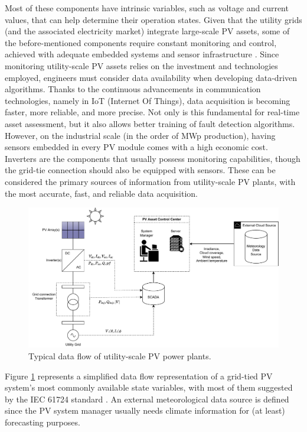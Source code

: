 Most of these components have intrinsic variables, such as voltage and current values, that can help determine their operation states. Given that the utility grids (and the associated electricity market) integrate large-scale PV assets, some of the before-mentioned components require constant monitoring and control, achieved with adequate embedded systems and sensor infrastructure \cite{AIPV}. Since monitoring utility-scale PV assets relies on the investment and technologies employed, engineers must consider data availability when developing data-driven algorithms. Thanks to the continuous advancements in communication technologies, namely in IoT (Internet Of Things), data acquisition is becoming faster, more reliable, and more precise. Not only is this fundamental for real-time asset assessment, but it also allows better training of fault detection algorithms. However, on the industrial scale (in the order of MWp production), having sensors embedded in every PV module comes with a high economic cost. Inverters are the components that usually possess monitoring capabilities, though the grid-tie connection should also be equipped with sensors. These can be considered the primary sources of information from utility-scale PV plants, with the most accurate, fast, and reliable data acquisition.

\begin{figure}[h!]
    \centering
    \includegraphics[width=\linewidth]{figures/chapter2/pvdata.drawio.pdf}
    \caption{Typical data flow of utility-scale PV power plants.}
    \label{fig:pvdataflow}
\end{figure}

Figure \ref{fig:pvdataflow} represents a simplified data flow representation of a grid-tied PV system's most commonly available state variables, with most of them suggested by the IEC 61724 standard \cite{iec61724}. An external meteorological data source is defined since the PV system manager usually needs climate information for (at least) forecasting purposes.

